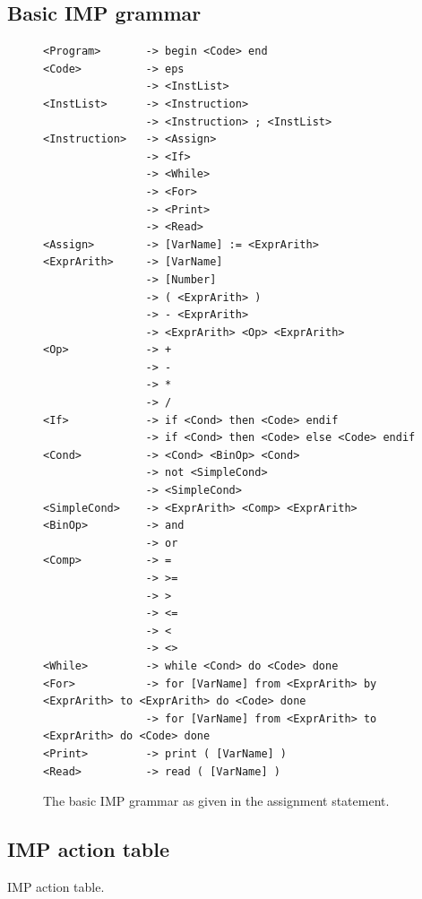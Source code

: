 \documentclass[a4paper,11pt]{article}
\begin{document}
  \subsection{Basic IMP grammar}
    \begin{figure}[h!]
      \centering
      \begin{lstlisting}
<Program>       -> begin <Code> end
<Code>          -> eps
                -> <InstList>
<InstList>      -> <Instruction>
                -> <Instruction> ; <InstList>
<Instruction>   -> <Assign>
                -> <If>
                -> <While>
                -> <For>
                -> <Print>
                -> <Read>
<Assign>        -> [VarName] := <ExprArith>
<ExprArith>     -> [VarName]
                -> [Number]
                -> ( <ExprArith> )
                -> - <ExprArith>
                -> <ExprArith> <Op> <ExprArith>
<Op>            -> +
                -> -
                -> *
                -> /
<If>            -> if <Cond> then <Code> endif
                -> if <Cond> then <Code> else <Code> endif
<Cond>          -> <Cond> <BinOp> <Cond>
                -> not <SimpleCond>
                -> <SimpleCond>
<SimpleCond>    -> <ExprArith> <Comp> <ExprArith>
<BinOp>         -> and
                -> or
<Comp>          -> = 
                -> >= 
                -> > 
                -> <= 
                -> < 
                -> <> 
<While>         -> while <Cond> do <Code> done
<For>           -> for [VarName] from <ExprArith> by <ExprArith> to <ExprArith> do <Code> done
                -> for [VarName] from <ExprArith> to <ExprArith> do <Code> done
<Print>         -> print ( [VarName] )
<Read>          -> read ( [VarName] )
      \end{lstlisting}
      \caption{The basic IMP grammar as given in the assignment statement.}
      \label{fig:basicimpgrammar}
    \end{figure}
    
  \subsection{IMP action table}
    \begin{table} %
      \centering
      
      \caption{IMP action table.}
      \label{impactiontable}
    \end{table}
    
\end{document}
